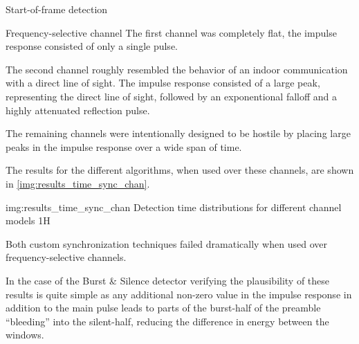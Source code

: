 \begin{subchapter}{Start-of-frame detection}
\begin{subsubchapter}{Frequency-selective channel}
    The first channel was completely flat, the impulse response
    consisted of only a single pulse.

    The second channel roughly resembled the behavior of
    an indoor communication with a direct line of sight.
    The impulse response consisted of a large peak, representing the
    direct line of sight, followed by an exponentional falloff and a
    highly attenuated reflection pulse.

    The remaining channels were intentionally designed to
    be hostile by placing large peaks in the impulse response
    over a wide span of time.

    The results for the different algorithms, when used over these
    channels, are shown in \autoref{img:results_time_sync_chan}.

                 {img:results_time_sync_chan}
                 {Detection time distributions for different channel models}
                 {1}{H}

    Both custom synchronization techniques failed dramatically
    when used over frequency-selective channels.

    In the case of the Burst \& Silence detector verifying the
    plausibility of these results is quite simple as any
    additional non-zero value in the impulse response in addition
    to the main pulse leads to parts of the burst-half of the
    preamble ``bleeding'' into the silent-half, reducing the
    difference in energy between the windows.
  \end{subsubchapter}
\end{subchapter}

